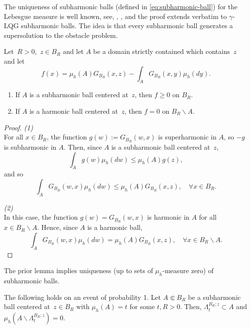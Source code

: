 \documentclass[12pt]{amsart}
\numberwithin{equation}{section}
\newcommand{\regcluster}[2]{\hyperref[eq:regular-cluster]{\Lambda^{#1}_{#2}}}
\begin{document}
	The uniqueness of subharmonic balls (defined in \eqref{eq:subharmonic-ball}) for the Lebesgue measure is well known, see, \eg, \cite{sakai1984solutions},
	and the proof extends verbatim to $\gamma$-LQG subharmonic balls.
	The idea is that every subharmonic ball generates a supersolution to the obstacle problem.
	\begin{lemma} \label{lemma:obstacle-comp}
		Let~$R > 0$,~$z \in B_R$ and let $A$ be a domain strictly contained which contains~$z$ and let
		\begin{equation} \label{eq:obstacle-comp}
		f(x) = \mu_h(A) G_{B_R}(x,z) - \int_{A} G_{B_R}(x,y)  \mu_h(d y).
		\end{equation}
		\begin{enumerate}
			\item If $A$ is a subharmonic ball centered at~$z$, then $f \geq 0$ on $B_R$. 
			\item If $A$ is a harmonic ball centered at~$z$, then $f = 0$ on $B_R \backslash A$. 
		\end{enumerate}
	\end{lemma} 
	\begin{proof}
		{\it (1)} \\
		For all $x \in B_R$, the function $g(w) := G_{B_R}(w, x)$
		is superharmonic in $A$, so $-g$ is subharmonic in $A$. Then, since $A$ is a subharmonic ball centered at~$z$, 
		\begin{equation}
		\int_{A} g(w) \mu_h(dw) \leq \mu_h(A) g(z),
		\end{equation}
		and so 
		\begin{equation}
		\int_{A} G_{B_R}(w, x) \mu_h(dw) \leq \mu_h(A) G_{B_R}(x,z) ,\quad \forall x \in B_R .
		\end{equation} 
		
		{\it (2)} \\ 
		In this case, the function $g(w) = G_{B_R}(w, x)$ is harmonic in $A$ for all $x \in B_R \backslash A$. 
		Hence, since $A$ is a harmonic ball, 
		\begin{equation}
		\int_{A} G_{B_R}(w, x) \mu_h(dw) = \mu_h(A) G_{B_R}(x,z) ,\quad \forall x \in B_R \backslash A .
		\end{equation}
	\end{proof}
	
	The prior lemma implies uniqueness (up to sets of $\mu_h$-measure zero) of subharmonic balls. 
	\begin{prop} \label{prop:sub-harmonic-ball-uniqueness} 
		The following holds on an event of probability 1. Let $A \Subset B_R$ be a subharmonic ball centered at~$z \in B_R$ with $\mu_h(A)=t$ for some $t, R > 0$. Then, ${\regcluster{B_R;z}{t}} \subset A$ and $\mu_h(A \backslash {\regcluster{B_R;z}{t}}) = 0$.  
	\end{prop}
	
\end{document}

